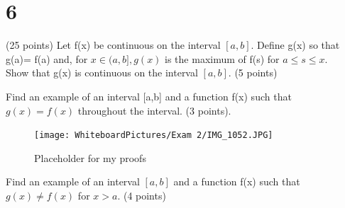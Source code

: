 \section*{6}
(25 points) 
Let f(x) be continuous on the interval $[a,b].$ Define g(x) so that g(a)= f(a) and, for $x \in (a,b], g(x)$ is the maximum of f(s) for $a \leq s \leq x.$ \\ 
\newpage
Show that g(x) is continuous on the interval $[a,b].$ (5 points) 
\begin{figure}[h]\end{figure} 
Find an example of an interval [a,b] and a function f(x) such that $g(x)=f(x)$ throughout the interval. (3 points). \\
\begin{figure}[h]\begin{center}\texttt{[image: WhiteboardPictures/Exam 2/IMG\_1052.JPG]}
\caption{Placeholder for my proofs} \label{fig:Euler_pic}\end{center}\end{figure} 
\newpage 
Find an example of an interval $[a,b]$ and a function f(x) such that $g(x) \neq f(x)$ for $x>a.$ (4 points) \\ 

\begin{figure}[h]\end{figure} 


